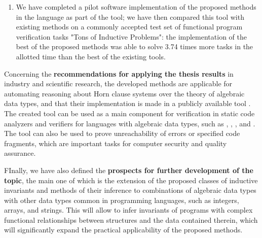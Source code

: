 \begin{enumerate}
\item We have completed a pilot software implementation of the proposed methods in the \fsharp{} language as part of the \theringen{} tool; we have then compared this tool with existing methods on a commonly accepted test set of functional program verification tasks "Tons of Inductive Problems": the implementation of the best of the proposed methods was able to solve 3.74 times more tasks in the allotted time than the best of the existing tools.
\end{enumerate}

Concerning the \textbf{recommendations for applying the thesis results} in industry and scientific research, the developed methods are applicable for automating reasoning about Horn clause systems over the theory of algebraic data types, and that their implementation is made in a publicly available tool \theringen{}. The created tool can be used as a main component for verification in static code analyzers and verifiers for languages with algebraic data types, such as \rust{}, \scala{}, \solidity{}, \haskell{} and \ocaml{}. The tool can also be used to prove unreachability of errors or specified code fragments, which are important tasks for computer security and quality assurance.


FInally, we have also defined the \textbf{prospects for further development of the topic}, the main one of which is the extension of the proposed classes of inductive invariants and methods of their inference to combinations of algebraic data types with other data types common in programming languages, such as integers, arrays, and strings. This will allow to infer invariants of programs with complex functional relationships between structures and the data contained therein, which will significantly expand the practical applicability of the proposed methods.
